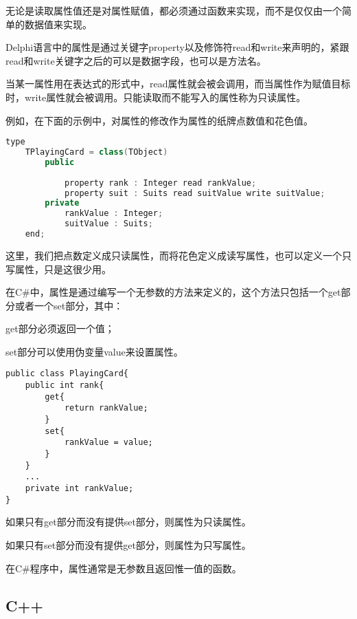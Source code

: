 无论是读取属性值还是对属性赋值，都必须通过函数来实现，而不是仅仅由一个简单的数据值来实现。

Delphi语言中的属性是通过关键字property以及修饰符read和write来声明的，紧跟read和write关键字之后的可以是数据字段，也可以是方法名。

当某一属性用在表达式的形式中，read属性就会被会调用，而当属性作为赋值目标时，write属性就会被调用。只能读取而不能写入的属性称为只读属性。

例如，在下面的示例中，对属性的修改作为属性的纸牌点数值和花色值。







\begin{lstlisting}[language=C++]
type
	TPlayingCard = class(TObject)
		public
				
			property rank : Integer read rankValue;
			property suit : Suits read suitValue write suitValue;
		private
			rankValue : Integer;
			suitValue : Suits;
	end;
\end{lstlisting}

这里，我们把点数定义成只读属性，而将花色定义成读写属性，也可以定义一个只写属性，只是这很少用。


在C\#中，属性是通过编写一个无参数的方法来定义的，这个方法只包括一个get部分或者一个set部分，其中：

\begin{compactitem}
\item get部分必须返回一个值；
\item set部分可以使用伪变量value来设置属性。
\end{compactitem}

\begin{lstlisting}[language={[Sharp]C}]
public class PlayingCard{
	public int rank{
		get{
			return rankValue;
		}
		set{
			rankValue = value;
		}
	}
	...
	private int rankValue;
}
\end{lstlisting}

\begin{compactitem}
\item 如果只有get部分而没有提供set部分，则属性为只读属性。
\item 如果只有set部分而没有提供get部分，则属性为只写属性。
\end{compactitem}

在C\#程序中，属性通常是无参数且返回惟一值的函数。

\subsection{C++}


